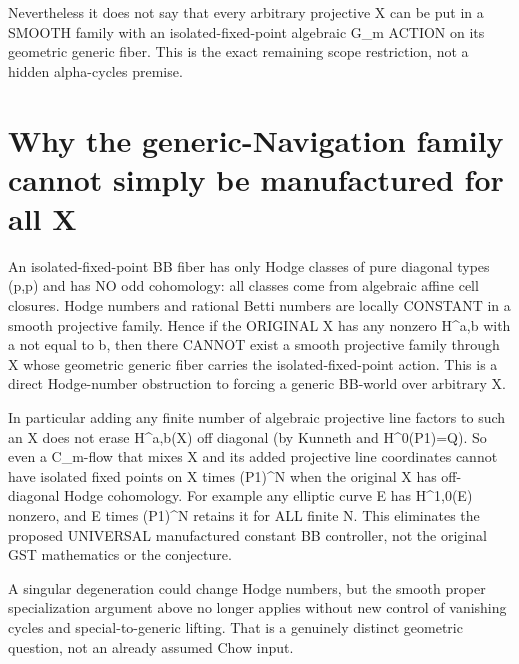 \documentclass[11pt]{article}
\begin{document}
Nevertheless it does not say
that every arbitrary projective X
can be put in a SMOOTH family
with an isolated-fixed-point
algebraic G_m ACTION on its
geometric generic fiber.
This is the exact remaining
scope restriction, not a
hidden alpha-cycles premise.

\section{Why the generic-Navigation family cannot simply be manufactured for all X}
An isolated-fixed-point BB
fiber has only Hodge classes
of pure diagonal types (p,p)
and has NO odd cohomology:
all classes come from algebraic
affine cell closures.
Hodge numbers and rational Betti
numbers are locally CONSTANT in
a smooth projective family.
Hence if the ORIGINAL X has
any nonzero H^{a,b} with
a not equal to b, then there
CANNOT exist a smooth projective
family through X whose
geometric generic fiber carries
the isolated-fixed-point action.
This is a direct Hodge-number
obstruction to forcing a
generic BB-world over arbitrary X.

In particular adding any finite
number of algebraic projective
line factors to such an X does
not erase H^{a,b}(X) off diagonal
(by Kunneth and H^0(P1)=Q).
So even a C_m-flow that mixes
X and its added projective
line coordinates cannot have
isolated fixed points on
X times (P1)^N when the
original X has off-diagonal
Hodge cohomology.
For example any elliptic
curve E has H^{1,0}(E) nonzero,
and E times (P1)^N retains it
for ALL finite N.
This eliminates the proposed
UNIVERSAL manufactured constant
BB controller, not the
original GST mathematics
or the conjecture.

A singular degeneration could
change Hodge numbers, but the
smooth proper specialization
argument above no longer
applies without new control
of vanishing cycles and
special-to-generic lifting.
That is a genuinely distinct
geometric question, not
an already assumed Chow input.
\end{document}
